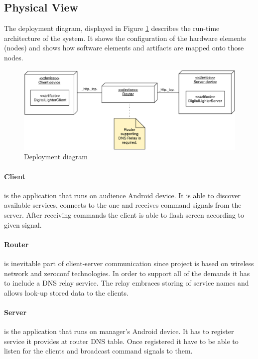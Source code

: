 \subsection{Physical View}
The deployment diagram, displayed in Figure \ref{fig:deployment_diagram} describes the run-time architecture of the system. It shows the configuration of the hardware elements (nodes) and shows how software elements and artifacts are mapped onto those nodes.

\begin{figure}[H]
	\centering
		\includegraphics[width=15cm]{images/deployment-diagram-sprint1}
	\caption{Deployment diagram}
	\label{fig:deployment_diagram}
\end{figure}

\paragraph{Client}
is the application that runs on audience Android device. It is able to discover available services, connects to the one and receives command signals from the server. After receiving commands the client is able to flash screen according to given signal.

\paragraph{Router}
is inevitable part of client-server communication since project is based on wireless network and zeroconf technologies. In order to support all of the demands it has to include a DNS relay service. The relay embraces storing of service names and allows look-up stored data to the clients.

\paragraph{Server}
is the application that runs on manager's Android device. It has to register service it provides at router DNS table. Once registered it have to be able to listen for the clients and broadcast command signals to them.

